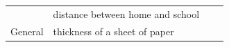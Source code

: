 {\begin{tabular}[t]{|l|l|l|l|}
    
     \tabularnewline\cline{1-1}\cline{2-2}\cline{3-3}\cline{4-4}
    
    
         &
    
    
        distance between home and school &
    
    
         &
    
    
     \tabularnewline\cline{1-1}\cline{2-2}\cline{3-3}\cline{4-4}
    
    
        General &
    
    
        thickness of a sheet of paper &
    
    
         &
    

\end{tabular}}
